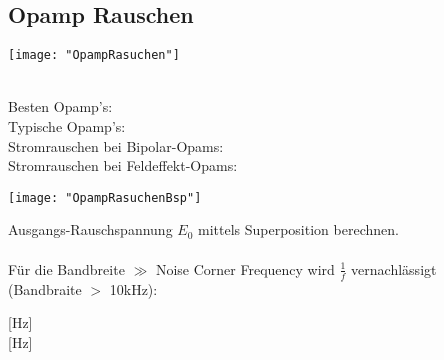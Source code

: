 
\subsection{Opamp Rauschen}

\begin{minipage}[t]{0.3\textwidth}
	\vspace{0pt}
	\texttt{[image: "OpampRasuchen"]}
\end{minipage}\hspace{0.05\textwidth}
\begin{minipage}[t]{0.3\textwidth}
	\vspace{0pt}
	\\
	Besten Opamp's: \\
	Typische Opamp's: \\
	Stromrauschen bei Bipolar-Opams: \\
	Stromrauschen bei Feldeffekt-Opams: 
\end{minipage}\hspace{0.05\textwidth}
\begin{minipage}[t]{0.3\textwidth}
\end{minipage}
\vspace{2mm}

\begin{minipage}[t]{0.3\textwidth}
	\vspace{0pt}
	\texttt{[image: "OpampRasuchenBsp"]}
\end{minipage}\hspace{0.05\textwidth}
\begin{minipage}[t]{0.3\textwidth}
	\vspace{0pt}
	Ausgangs-Rauschspannung $E_0$ mittels Superposition berechnen.\\
	\\
	Für die Bandbreite $\gg$ Noise Corner Frequency wird $\frac{1}{f}$ vernachlässigt (Bandbraite $>$ 10kHz):
\end{minipage}\hspace{0.05\textwidth}
\begin{minipage}[t]{0.3\textwidth}
	 [Hz]\\
	 [Hz]\\
	\\
\end{minipage}
\vspace{2mm}





